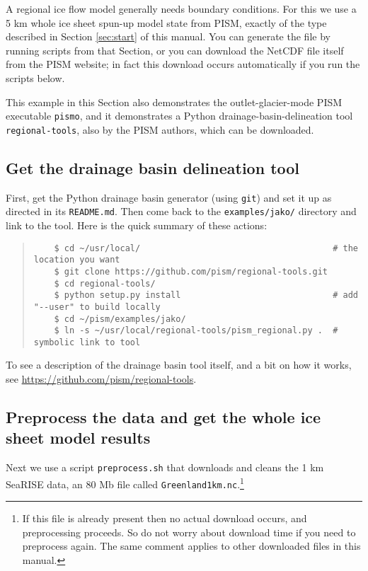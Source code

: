 A regional ice flow model generally needs boundary conditions.  For this we use a 5 km whole ice sheet spun-up model state from PISM, exactly of the type described in Section \ref{sec:start} of this manual.  You can generate the file by running scripts from that Section, or you can download the NetCDF file itself from the PISM website; in fact this download occurs automatically if you run the scripts below.

This example in this Section also demonstrates the outlet-glacier-mode PISM executable \texttt{pismo}, and it demonstrates a Python drainage-basin-delineation tool \texttt{regional-tools}, also by the PISM authors, which can be downloaded.

\subsection*{Get the drainage basin delineation tool}
First, get the Python drainage basin generator (using \texttt{git}) and set it up as directed in its \texttt{README.md}.  Then come back to the \texttt{examples/jako/} directory and link to the tool.  Here is the quick summary of these actions:
\begin{quote}\small
\begin{verbatim}
    $ cd ~/usr/local/                                      # the location you want
    $ git clone https://github.com/pism/regional-tools.git
    $ cd regional-tools/
    $ python setup.py install                              # add "--user" to build locally
    $ cd ~/pism/examples/jako/
    $ ln -s ~/usr/local/regional-tools/pism_regional.py .  # symbolic link to tool
\end{verbatim}
\normalsize\end{quote}
To see a description of the drainage basin tool itself, and a bit on how it
works, see \url{https://github.com/pism/regional-tools}.

\subsection*{Preprocess the data and get the whole ice sheet model results}
Next we use a script \texttt{preprocess.sh} that downloads and cleans the 1 km SeaRISE data, an 80 Mb file called \texttt{Greenland1km.nc}.\footnote{If this file is already present then no actual download occurs, and preprocessing proceeds.  So do not worry about download time if you need to preprocess again.  The same comment applies to other downloaded files in this manual.}

